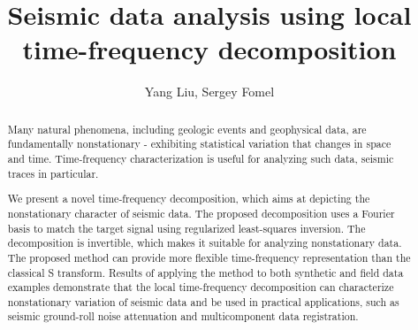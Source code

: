  \title{Seismic data analysis using local time-frequency decomposition}

\renewcommand{\thefootnote}{\fnsymbol{footnote}}


\address{
\footnotemark[1] College of Geo-exploration Science and Technology,\\
Jilin University \\
No.6 Xi minzhu street, \\
Changchun, China, 130026 \\
\footnotemark[2] Bureau of Economic Geology,\\
John A. and Katherine G. Jackson School of Geosciences \\
The University of Texas at Austin \\
University Station, Box X \\
Austin, TX, USA, 78713-8924}

\author{Yang Liu\footnotemark[1]\footnotemark[2], Sergey Fomel\footnotemark[2]}


\maketitle
\begin{abstract}
Many natural phenomena, including geologic
events and geophysical data, are fundamentally nonstationary -
exhibiting statistical variation that changes in space and
time. Time-frequency characterization is useful for analyzing such
data, seismic traces in particular. 

We present a novel time-frequency
decomposition, which aims at depicting the 
nonstationary character of seismic data. The proposed
decomposition uses a Fourier basis to match the target
signal using regularized least-squares inversion. The decomposition is
invertible, which makes it suitable for
analyzing nonstationary data. The proposed method can provide more
flexible time-frequency representation than the classical S
transform. Results of applying the method to both synthetic and field
data examples demonstrate that the local time-frequency
decomposition can characterize nonstationary
variation of seismic data and be used in practical
applications, such as seismic ground-roll noise attenuation and
multicomponent data registration.
\end{abstract}


